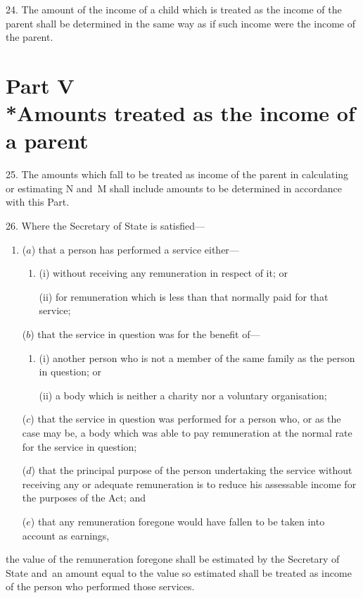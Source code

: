 \documentclass[12pt,a4paper]{article}
\begin{document}
\medskip

24.  The amount of the income of a child which is treated as the income of the parent shall be determined in the same way as if such income were the income of the parent.

\section[Part V --- Amounts treated as the income of a parent]{Part V\\*Amounts treated as the income of a parent}

\renewcommand\parthead{--- Schedule 1 Part V}

25.  The amounts which fall to be treated as income of the parent in calculating or estimating N and~M shall include amounts to be determined in accordance with this Part.

\medskip

26.  Where 
the Secretary of State  %
is satisfied—
\begin{enumerate}\item[]
($a$) that a person has performed a service either—
\begin{enumerate}\item[]
(i) without receiving any remuneration in respect of it; or

(ii) for remuneration which is less than that normally paid for that service;
\end{enumerate}

($b$) that the service in question was for the benefit of—
\begin{enumerate}\item[]
(i) another person who is not a member of the same family as the person in question; or

(ii) a body which is neither a charity nor a voluntary organisation;
\end{enumerate}

($c$) that the service in question was performed for a person who, or as the case may be, a body which was able to pay remuneration at the normal rate for the service in question;

($d$) that the principal purpose of the person undertaking the service without receiving any or adequate remuneration is to reduce his assessable income for the purposes of the Act; and

($e$) that any remuneration foregone would have fallen to be taken into account as earnings,
\end{enumerate}
the value of the remuneration foregone shall be estimated by 
the Secretary of State  %
and~an amount equal to the value so estimated shall be treated as income of the person who performed those services.
\end{document}

